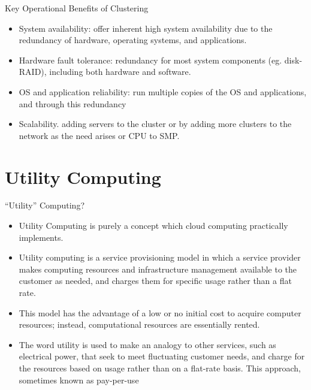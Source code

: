 \documentclass{SKP-beamer}
\begin{document}
\begin{frame}{Key Operational Benefits of Clustering}
	\begin{itemize}
		
		\item   System availability: offer inherent high system availability due to the redundancy of hardware, operating systems, and applications.
		\item Hardware fault tolerance: redundancy for most system 
		components (eg. disk-RAID), including both hardware and 
		software.
		\item OS and application reliability: run multiple copies of the OS	and applications, and through this redundancy
		\item Scalability. adding servers to the cluster or by adding more clusters to the network as the need arises or CPU to SMP.
		
	\end{itemize}
\end{frame}

\section{\textbf{Utility Computing}}

\begin{frame}{“Utility” Computing?}
	\begin{itemize}
		
		\item Utility Computing is purely a concept which cloud computing practically implements.
		\item Utility computing is a service provisioning model in which a service provider makes 
		computing resources and infrastructure management available to the customer as 
		needed, and charges them for specific usage rather than a flat rate.
		\item This model has the advantage of a low or no initial cost to acquire computer resources; 
		instead, computational resources are essentially rented.
		\item The word utility is used to make an analogy to other services, such as electrical power, 
		that seek to meet fluctuating customer needs, and charge for the resources based on 
		usage rather than on a flat-rate basis. This approach, sometimes known as pay-per-use
		
		
	\end{itemize}
\end{frame}
\end{document}
